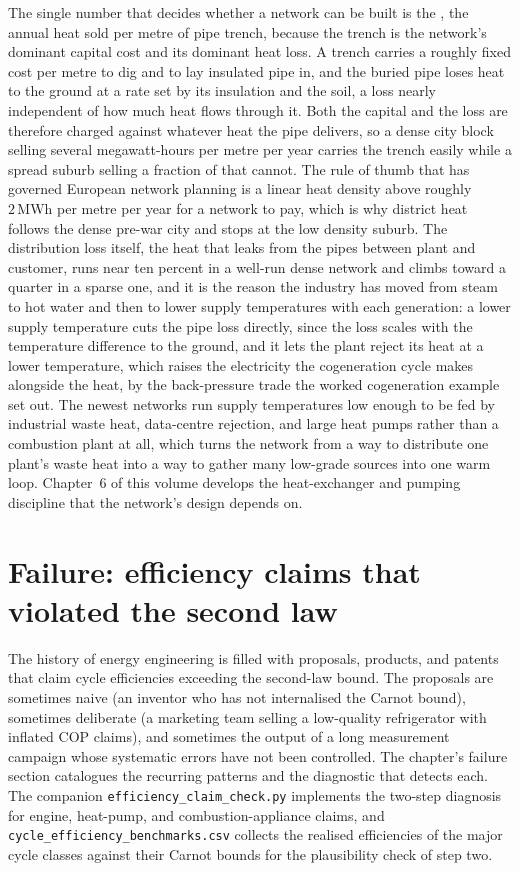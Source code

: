 The single number that decides whether a network can be built is the
, the annual heat sold per metre of pipe trench,
because the trench is the network's dominant capital cost and its dominant heat
loss. A trench carries a roughly fixed cost per metre to dig and to lay insulated
pipe in, and the buried pipe loses heat to the ground at a rate set by its
insulation and the soil, a loss nearly independent of how much heat flows through
it. Both the capital and the loss are therefore charged against whatever heat the
pipe delivers, so a dense city block selling several megawatt-hours per metre per
year carries the trench easily while a spread suburb selling a fraction of that
cannot. The rule of thumb that has governed European network planning is a linear
heat density above roughly $2\,\text{MWh}$ per metre per year for a network to pay,
which is why district heat follows the dense pre-war city and stops at the low
density suburb. The distribution loss itself, the heat that leaks from the pipes
between plant and customer, runs near ten percent in a well-run dense network and
climbs toward a quarter in a sparse one, and it is the reason the industry has moved
from steam to hot water and then to lower supply temperatures with each generation:
a lower supply temperature cuts the pipe loss directly, since the loss scales with
the temperature difference to the ground, and it lets the plant reject its heat at a
lower temperature, which raises the electricity the cogeneration cycle makes
alongside the heat, by the back-pressure trade the worked cogeneration example set
out. The newest networks run supply temperatures low enough to be fed by industrial
waste heat, data-centre rejection, and large heat pumps rather than a combustion
plant at all, which turns the network from a way to distribute one plant's waste
heat into a way to gather many low-grade sources into one warm loop. Chapter~6 of
this volume develops the heat-exchanger and pumping discipline that the network's
design depends on.

\section{Failure: efficiency claims that violated the second law}

The history of energy engineering is filled with proposals, products,
and patents that claim cycle efficiencies exceeding the second-law
bound. The proposals are sometimes naive (an inventor who has not
internalised the Carnot bound), sometimes deliberate (a marketing
team selling a low-quality refrigerator with inflated COP claims),
and sometimes the output of a long measurement campaign whose
systematic errors have not been controlled. The chapter's failure
section catalogues the recurring patterns and the diagnostic that
detects each. The companion \texttt{efficiency\_claim\_check.py}
implements the two-step diagnosis for engine, heat-pump, and
combustion-appliance claims, and \texttt{cycle\_efficiency\_benchmarks.csv}
collects the realised efficiencies of the major cycle classes against
their Carnot bounds for the plausibility check of step two.

